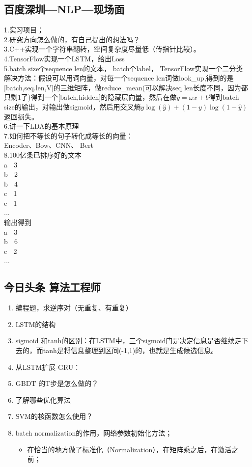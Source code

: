\documentclass[UTF8]{article}%
\begin{document}
	\date{2019年4月1日}
	\subsection{百度深圳---NLP---现场面}
	1.实习项目；\\
	2.研究方向怎么做的，有自己提出的想法吗？\\
	3.C++实现一个字符串翻转，空间复杂度尽量低（传指针比较）。\\
	4.TensorFlow实现一个LSTM，给出Loss\\
	5.batch size个sequence len的文本， batch个label， TensorFlow实现一个二分类\\
	解决方法：假设可以用词向量，对每一个sequence len词做look\_up,得到的是[batch,seq.len,V]的三维矩阵，做reduce\_mean(可以解决seq len长度不同，因为都只剩1了)得到一个[batch,hidden]的隐藏层向量，然后在做$y=\omega x + b$得到batch size的输出，对输出做sigmoid，然后用交叉熵$y\log(\hat{y})+(1-y)\log{(1-\hat{y})}$返回损失。\\
	6.讲一下LDA的基本原理\\
	7.如何把不等长的句子转化成等长的向量：\\
	Encoder、Bow、CNN、 Bert\\
	8.100亿条已排序好的文本\\
	\center 
	a $\;$ 3\\
	b $\;$ 2\\
	b $\;$ 4\\
	c $\;$ 1\\
	c $\;$ 1\\
	...\\
	输出得到\\
	a $\;$  3\\
	b $\;$ 6\\
	c $\;$ 2\\
	...\\
	\flushleft
	\date{2019年4月17日}
	\subsection{今日头条 算法工程师}
		\begin{enumerate}
			\item 编程题，求逆序对（无重复、有重复）
			\item LSTM的结构
			\item sigmoid 和tanh的区别：在LSTM中，三个sigmoid门是决定信息是否继续走下去的，而tanh是将信息整理到区间(-1,1)的，也就是生成候选信息。
			\item 从LSTM扩展-GRU：
			\item GBDT 的T步是怎么做的？
			\item 了解哪些优化算法
			\item SVM的核函数怎么使用？
			\item batch normalization的作用，网络参数初始化方法；
			\begin{itemize}
				\item 在恰当的地方做了标准化（Normalization），在矩阵乘之后，在激活之前；
			\end{itemize}
		\end{enumerate}
	
\end{document}
